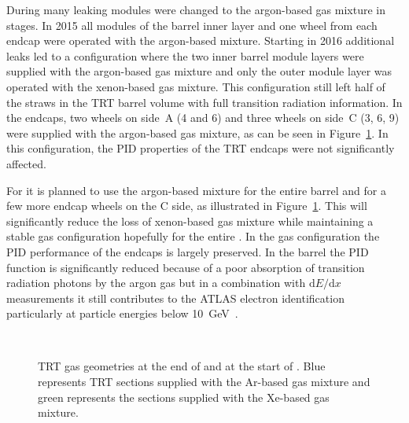 \documentclass[cernpreprint, atlasdraft=false, UKenglish,british,orcidlogo, texmf, orcidlogo]{atlasdoc}
\begin{document}
During \RunTwo many leaking modules were changed to the argon-based gas mixture in stages. In 2015 all modules of the barrel inner layer and one wheel from each endcap were operated with the argon-based mixture. Starting in 2016 additional leaks led to a configuration where the two inner barrel module layers were supplied with the argon-based gas mixture and only the outer module layer was operated with the xenon-based gas mixture. This configuration still left half of the straws in the \gls{TRT} barrel volume with full transition radiation information. In the endcaps, two wheels on side~A (4 and 6) and three wheels on side~C (3, 6, 9) were supplied with the argon-based gas mixture, as can be seen in Figure~\ref{fig:TRTgeo}. In this configuration, the \gls{PID} properties of the \gls{TRT} endcaps were not significantly affected.
 
For \RunThr it is planned to use the argon-based mixture for the entire barrel and for a few more endcap wheels on the C side, as illustrated in Figure~\ref{fig:TRTgeo}.
This will significantly reduce the loss of xenon-based gas mixture while maintaining a stable gas configuration hopefully for the entire \RunThr.
In the \RunThr gas configuration the \gls{PID} performance of the endcaps is largely preserved.
In the barrel the \gls{PID} function is significantly reduced because of a poor absorption of transition radiation photons by the argon gas
but in a combination with $\text{d}E/\text{d}x$ measurements it still contributes to the ATLAS electron identification particularly at particle energies below \SI{10}{\GeV}~\cite{IDET-2015-01}.
 
\begin{figure}[htbp]
\centering
{}\\
\caption{
\gls{TRT} gas geometries \protect{} at the end of \RunTwo and \protect{} at the start of \RunThr. Blue represents \gls{TRT} sections supplied with the Ar-based gas mixture and green represents the sections supplied with the Xe-based gas mixture.
}
\label{fig:TRTgeo}
\end{figure}


 
\end{document}
